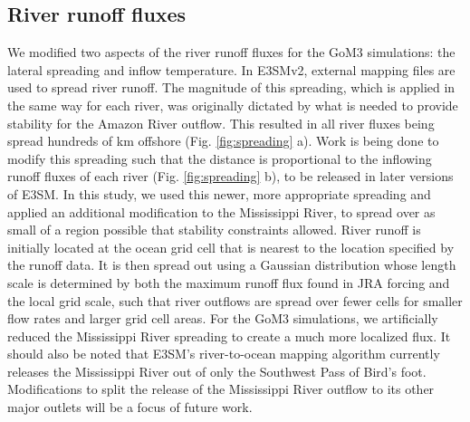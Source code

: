\subsection{River runoff fluxes}
We modified two aspects of the river runoff fluxes for the GoM3 simulations: the lateral spreading and inflow temperature. In E3SMv2, external mapping files are used to spread river runoff. The magnitude of this spreading, which is applied in the same way for each river, was originally dictated by what is needed to provide stability for the Amazon River outflow. This resulted in all river fluxes being spread hundreds of km offshore (Fig. \ref{fig:spreading} a). Work is being done to modify this spreading such that the distance is proportional to the inflowing runoff fluxes of each river (Fig. \ref{fig:spreading} b), to be released in later versions of E3SM. In this study, we used this newer, more appropriate spreading and applied an additional modification to the Mississippi River, to spread over as small of a region possible that stability constraints allowed. River runoff is initially located at the ocean grid cell that is nearest to the location specified by the runoff data. It is then spread out using a Gaussian distribution whose length scale is determined by both the maximum runoff flux found in JRA forcing and the local grid scale, such that river outflows are spread over fewer cells for smaller flow rates and larger grid cell areas. For the GoM3 simulations, we artificially reduced the Mississippi River spreading to create a much more localized flux. It should also be noted that E3SM's river-to-ocean mapping algorithm currently releases the Mississippi River out of only the Southwest Pass of Bird's foot. Modifications to split the release of the Mississippi River outflow to its other major outlets will be a focus of future work.

